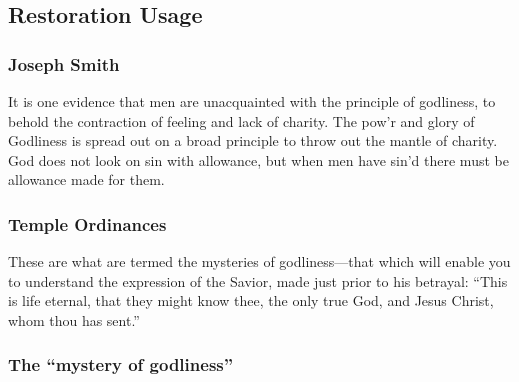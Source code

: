 \subsection{Restoration Usage} %
	\label{GODLINESS-RESTORATION}

	\subsubsection{Joseph Smith} %
		\label{GODLINESS-JS}
	
		\begin{compactdesc}
			\item[{\hyperref[EMS-1842-JS-9-JUN-1842]{9 June 1842}}] It is one evidence that men are unacquainted with the principle of godliness, to behold the contraction of feeling and lack of charity. The pow'r and glory of Godliness is spread out on a broad principle to throw out the mantle of charity. God does not look on sin with allowance, but when men have sin'd there must be allowance made for them.
		\end{compactdesc}
		
	\subsubsection{Temple Ordinances}
		\label{GODLINESS-TEMPLE}
	
		\begin{compactdesc}
			\item[{\hyperref[TEMPLE-ENDOWMENT-ENDOW-PRE-1990-LECTURE]{Newer lecture at the veil}}] These are what are termed the mysteries of godliness---that which will enable you to understand the expression of the Savior, made just prior to his betrayal: ``This is life eternal, that they might know thee, the only true God, and Jesus Christ, whom thou has sent.''
		\end{compactdesc}
	
	
	

	
		
	\subsubsection{The ``mystery of godliness''}
		\label{GODLINESS-mystery}